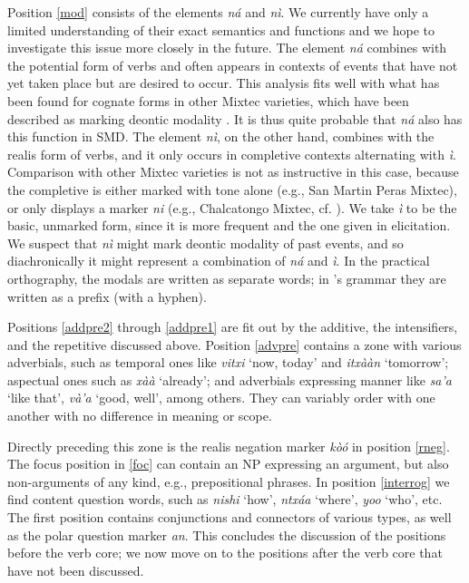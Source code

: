\documentclass[output=paper]{langscibook}
\begin{document}
Position \ref{mod} consists of the elements \textit{ná} and \textit{nì}. We currently have only a limited understanding of their exact semantics and functions and we hope to investigate this issue more closely in the future. 
The element \textit{ná} combines with the potential form of verbs and often appears in contexts of events that have not yet taken place but are desired to occur. This analysis fits well with what has been found for cognate forms in other Mixtec varieties, which have been described as marking deontic modality \citep[76--78]{macaulay1996grammar}. It is thus quite probable that \textit{ná} also has this function in SMD.
The element \textit{nì}, on the other hand, combines with the realis form of verbs, and it only occurs in completive contexts alternating with \textit{ì}. Comparison with other Mixtec varieties is not as instructive in this case, because the completive is either marked with tone alone (e.g., San Martin Peras Mixtec), or only displays a marker \textit{ni} (e.g., Chalcatongo Mixtec, cf. \citealt[74--75]{macaulay1996grammar}).
We take \textit{ì} to be the basic, unmarked form, since it is more frequent and the one given in elicitation. We suspect that \textit{nì} might mark deontic modality of past events, and so diachronically it might  represent a combination of \textit{ná} and \textit{ì}. 
In the practical orthography, the modals are written as separate words; in \citet{macaulay1996grammar}'s grammar they are written as a prefix (with a hyphen).

Positions \ref{addpre2} through \ref{addpre1} are fit out by the additive, the intensifiers, and the repetitive discussed above. 
Position \ref{advpre} contains a zone with various adverbials, such as temporal ones like \textit{vitxi} `now, today' and \textit{itxààn} `tomorrow'; aspectual ones such as \textit{xàà} `already'; and adverbials expressing manner like \textit{sa'a} `like that', \textit{và'a} `good, well', among others. 
They can variably order with one another with no difference in meaning or scope.

Directly preceding this zone is the realis negation marker \textit{kòó} in position \ref{rneg}. 
The focus position in \ref{foc} can contain an NP expressing an argument, but also non-arguments of any kind, e.g., prepositional phrases. In position \ref{interrog} we find content question words, such as \textit{nishi} `how', \textit{ntxáa} `where', \textit{yoo} `who', etc.
The first position contains conjunctions and connectors of various types, as well as the polar question marker \textit{an}. 
This concludes the discussion of the positions before the verb core; we now move on to the positions after the verb core that have not been discussed.
\end{document}
